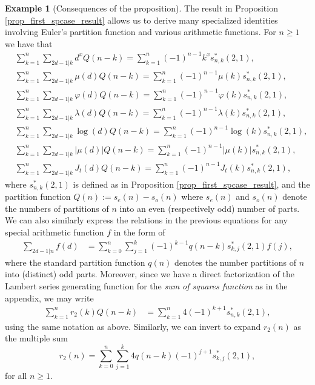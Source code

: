\documentclass[12pt,reqno,a4letter]{article}
\numberwithin{figure}{section}
\numberwithin{table}{section}
\numberwithin{equation}{section}
\theoremstyle{plain}
\numberwithin{theorem}{section}
\theoremstyle{definition}
\newtheorem{example}[theorem]{Example}
\begin{document}
\begin{example}[Consequences of the proposition] 
The result in Proposition \ref{prop_first_spcase_result} 
allows us to derive many specialized identities involving Euler's partition function and various arithmetic functions. 
For $n \geq 1$ we have that 
\begin{align*}
	& \sum_{k=1}^{n} \sum_{2d-1|k} d^x Q(n-k) = \sum_{k=1}^n (-1)^{n-1} k^x s_{n,k}^{\ast}(2, 1),\\
	& \sum_{k=1}^{n} \sum_{2d-1|k} \mu(d) Q(n-k) = \sum_{k=1}^{n} (-1)^{n-1} \mu(k) s_{n,k}^{\ast}(2, 1), \\
	& \sum_{k=1}^{n} \sum_{2d-1|k} \varphi(d) Q(n-k) = \sum_{k=1}^n (-1)^{n-1} \varphi(k) s_{n,k}^{\ast}(2, 1),\\
	& \sum_{k=1}^{n} \sum_{2d-1|k} \lambda(d) Q(n-k) = \sum_{k=1}^n (-1)^{n-1} \lambda(k) s_{n,k}^{\ast}(2, 1),\\
	& \sum_{k=1}^n \sum_{2d-1|k} \log(d) Q(n-k) = \sum_{k=1}^n (-1)^{n-1} \log(k) s_{n,k}^{\ast}(2, 1),\\
	& \sum_{k=1}^n \sum_{2d-1|k} |\mu(d)| Q(n-k) = \sum_{k=1}^n (-1)^{n-1} | \mu(k) | s_{n,k}^{\ast}(2, 1),\\
	& \sum_{k=1}^n \sum_{2d-1|k} J_t(d) Q(n-k) = \sum_{k=1}^n (-1)^{n-1} J_t(k) s_{n,k}^{\ast}(2, 1),
\end{align*}
where $s_{n,k}^{\ast}(2, 1)$ is defined as in 
Proposition \ref{prop_first_spcase_result}, and the partition function 
$Q(n) := s_e(n) - s_o(n)$ where $s_e(n)$ and $s_o(n)$ 
denote the numbers of partitions of $n$ into an even (respectively odd) number of parts. 
We can also similarly express the relations in the previous equations for any 
special arithmetic function $f$ in the form of 
\begin{align*} 
     \sum_{2d-1|n} f(d) & = \sum_{k=0}^n \sum_{j=1}^k (-1)^{k-1} q(n-k) s_{k,j}^{\ast}(2, 1) f(j), 
\end{align*} 
where the standard partition function $q(n)$ denotes the number partitions of $n$ into (distinct) odd parts. 
Moreover, since we have a direct factorization of the Lambert series generating function 
for the \emph{sum of squares function} as in the appendix, we may write 
\begin{align*} 
\sum_{k=1}^n r_2(k) Q(n-k) & = \sum_{k=1}^n 4 (-1)^{k+1} s_{n,k}^{\ast}(2, 1), 
\end{align*} 
using the same notation as above. Similarly, we can invert to expand $r_2(n)$ as the multiple sum 
\[
r_2(n) = \sum_{k=0}^n \sum_{j=1}^k 4 q(n-k) (-1)^{j+1} s_{k,j}^{\ast}(2, 1), 
\]
for all $n \geq 1$. 
\end{example} 
\end{document}
